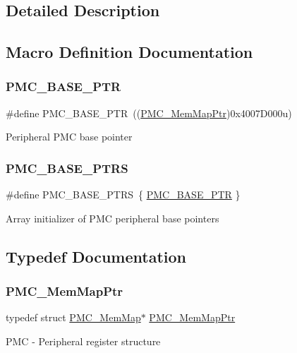 \subsection{Detailed Description}


\subsection{Macro Definition Documentation}
\mbox{\label{group___p_m_c___peripheral_gaf32df9f1096263f10a5e8978a338b2ac}} 
\subsubsection{\texorpdfstring{P\+M\+C\+\_\+\+B\+A\+S\+E\+\_\+\+P\+TR}{PMC\_BASE\_PTR}}
{\footnotesize\ttfamily \#define P\+M\+C\+\_\+\+B\+A\+S\+E\+\_\+\+P\+TR~((\hyperlink{group___p_m_c___peripheral_ga0e73f22a2fa26cbb012851719e34812e}{P\+M\+C\+\_\+\+Mem\+Map\+Ptr})0x4007\+D000u)}

Peripheral P\+MC base pointer \mbox{\label{group___p_m_c___peripheral_ga4bcd62643d597f7230f9c1e3d03caaa7}} 
\subsubsection{\texorpdfstring{P\+M\+C\+\_\+\+B\+A\+S\+E\+\_\+\+P\+T\+RS}{PMC\_BASE\_PTRS}}
{\footnotesize\ttfamily \#define P\+M\+C\+\_\+\+B\+A\+S\+E\+\_\+\+P\+T\+RS~\{ \hyperlink{group___p_m_c___peripheral_gaf32df9f1096263f10a5e8978a338b2ac}{P\+M\+C\+\_\+\+B\+A\+S\+E\+\_\+\+P\+TR} \}}

Array initializer of P\+MC peripheral base pointers 

\subsection{Typedef Documentation}
\mbox{\label{group___p_m_c___peripheral_ga0e73f22a2fa26cbb012851719e34812e}} 
\subsubsection{\texorpdfstring{P\+M\+C\+\_\+\+Mem\+Map\+Ptr}{PMC\_MemMapPtr}}
{\footnotesize\ttfamily typedef struct \hyperlink{struct_p_m_c___mem_map}{P\+M\+C\+\_\+\+Mem\+Map}$\ast$ \hyperlink{group___p_m_c___peripheral_ga0e73f22a2fa26cbb012851719e34812e}{P\+M\+C\+\_\+\+Mem\+Map\+Ptr}}

P\+MC -\/ Peripheral register structure 